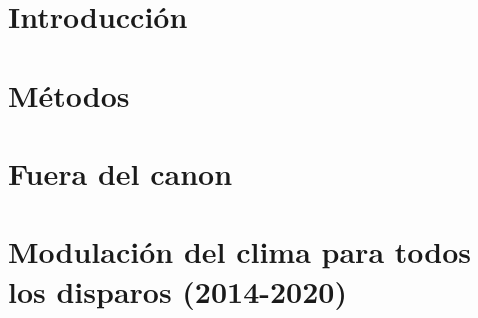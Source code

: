 \documentclass{ibtesis}
\begin{document}
\chapter{Introducción}
\graphicspath{{0_Introduccion/}}



\chapter{Métodos}
\graphicspath{{1_Metodo/}}



\chapter{Fuera del canon}
\graphicspath{{0_Introduccion/}}



% 

% 

% 


\chapter{Modulación del clima para todos los disparos (2014-2020)}
\graphicspath{{4_Weather_Modulation/}}


% 
\end{document}
